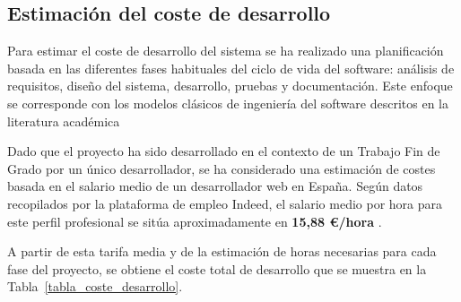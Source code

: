\subsection{Estimación del coste de desarrollo}

Para estimar el coste de desarrollo del sistema se ha realizado una planificación basada en las diferentes fases habituales del ciclo de vida del software: análisis de requisitos, diseño del sistema, desarrollo, pruebas y documentación. Este enfoque se corresponde con los modelos clásicos de ingeniería del software descritos en la literatura académica \cite[Chap.~2, pp.~27--37]{sommerville}

Dado que el proyecto ha sido desarrollado en el contexto de un Trabajo Fin de Grado por un único desarrollador, se ha considerado una estimación de costes basada en el salario medio de un desarrollador web en España. Según datos recopilados por la plataforma de empleo Indeed, el salario medio por hora para este perfil profesional se sitúa aproximadamente en \textbf{15,88 €/hora} \cite{indeed2024salarios}.

A partir de esta tarifa media y de la estimación de horas necesarias para cada fase del proyecto, se obtiene el coste total de desarrollo que se muestra en la Tabla~\ref{tabla_coste_desarrollo}.

